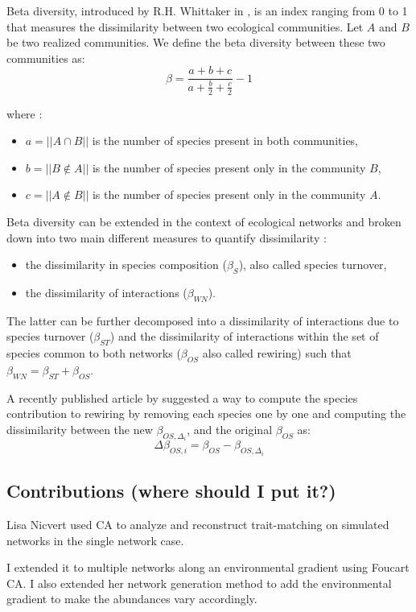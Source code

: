Beta diversity, introduced by R.H. Whittaker in \citet{whittaker_vegetation_1960}, is an index ranging from 0 to 1 that measures the dissimilarity between two ecological communities. Let $A$ and $B$ be two realized communities. We define the beta diversity between these two communities as: 
$$
    \beta = \frac{a+b+c}{a+\frac{b}{2} + \frac{c}{2}} - 1
$$

where :
\begin{itemize}
    \item $a = ||A \cap B||$ is the number of species present in both communities,
    \item $b = ||B \notin A||$ is the number of species present only in the community $B$,
    \item $c = ||A \notin B||$ is the number of species present only in the community $A$.
\end{itemize}

Beta diversity can be extended in the context of ecological networks and broken down into two main different measures to quantify dissimilarity \citet{poisot_dissimilarity_2012}:
\begin{itemize}
    \item the dissimilarity in species composition ($\beta_S$), also called species turnover,
    \item the dissimilarity of interactions ($\beta_{WN}$).
\end{itemize}
 The latter can be further decomposed into a dissimilarity of interactions due to species turnover ($\beta_{ST}$) and the dissimilarity of interactions within the set of species common to both networks ($\beta_{OS}$ also called rewiring) such that $\beta_{WN} = \beta_{ST} + \beta_{OS}$. 

A recently published article by \citet{toju_interaction_2024} suggested a way to compute the species contribution to rewiring by removing each species one by one and computing the dissimilarity between the new $\beta_{OS,\Delta_i}$, and the original $\beta_{OS}$ as:
$$
    \Delta\beta_{OS,i} = \beta_{OS} - \beta_{OS,\Delta_i}
$$

\subsection{Contributions (where should I put it?)}

Lisa Nicvert used CA to analyze and reconstruct trait-matching on simulated networks in the single network case.

I extended it to multiple networks along an environmental gradient using Foucart CA. I also extended her network generation method to add the environmental gradient to make the abundances vary accordingly.


